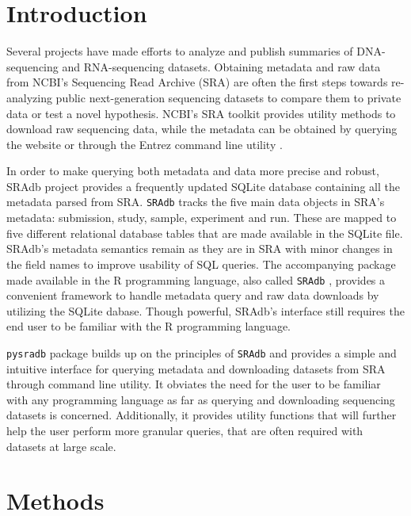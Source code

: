 \documentclass[9pt,a4paper]{extarticle}
\begin{document}
\clearpage
\pagestyle{main}
\section*{Introduction}
Several projects have made efforts to analyze and publish summaries of DNA-sequencing \cite{macarthur2012systematic} and RNA-sequencing \cite{lachmann2018massive, collado2017reproducible} datasets. Obtaining metadata and raw data from NCBI's Sequencing Read Archive (SRA)
\cite{leinonen2010sequence} are often the first steps towards re-analyzing public
next-generation sequencing datasets to compare them to private data or test a 
novel hypothesis. NCBI's SRA toolkit \cite{ncbisratoolit} provides utility methods
to download raw sequencing data, while the metadata can be obtained 
by querying the website or through the Entrez command line utility \cite{kans2018entrez}.


In order to make querying both metadata and data more precise and robust, SRAdb
\cite{zhu2013sradb} project provides a frequently updated SQLite database containing all the metadata parsed from SRA. \texttt{SRAdb} tracks the five main data objects in SRA's metadata: submission, study, sample, experiment and run. These are mapped to five different relational database tables that are made available in the SQLite file.
SRAdb's metadata semantics remain as they are in SRA with minor changes in the field names to improve usability of SQL queries. The accompanying package made available in the R programming language, also called \texttt{SRAdb} \cite{zhudavissradb},
provides a convenient framework to handle metadata query and raw data downloads by 
utilizing the SQLite dabase. Though powerful, SRAdb's interface still requires the end user to be familiar with the R programming language. 


\texttt{pysradb} package builds up on the principles of \texttt{SRAdb} and 
provides a simple and intuitive interface for querying metadata and downloading
datasets from SRA through command line utility. It obviates the need for the
user to be familiar with any programming language as far as querying and downloading sequencing datasets is concerned. Additionally, it provides utility functions that will further help the user perform more granular queries, that
are often required with datasets at large scale.






\section*{Methods}
\end{document}
